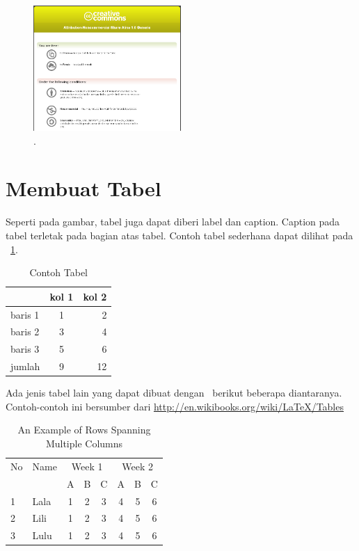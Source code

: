 \begin{figure}
	\centering
	\includegraphics[width=0.50\textwidth]
	{pics/creative_commons.png}
	\caption{\license.}
	\label{fig:testGambar}
\end{figure}


\section{Membuat Tabel}
Seperti pada gambar, tabel juga dapat diberi label dan caption. Caption pada
tabel terletak pada bagian atas tabel. Contoh tabel sederhana dapat dilihat
pada \tab~\ref{tab:tab1}.

\begin{table}
	\centering
	\caption{Contoh Tabel}
	\label{tab:tab1}
	\begin{tabular}{| l | c r |}
		\hline
		& kol 1 & kol 2 \\
		\hline
		baris 1 & 1 & 2 \\
		baris 2 & 3 & 4 \\
		baris 3 & 5 & 6 \\
		jumlah  & 9 & 12 \\
		\hline
	\end{tabular}
\end{table}

Ada jenis tabel lain yang dapat dibuat dengan \latex~berikut beberapa
diantaranya. Contoh-contoh ini bersumber dari
\url{http://en.wikibooks.org/wiki/LaTeX/Tables}

\begin{table}
	\centering
	\caption{An Example of Rows Spanning Multiple Columns}
	\label{row.spanning}
	\begin{tabular}{|l|l|*{6}{c|}} \hline %
		No & Name & \multicolumn{3}{|c|}{Week 1} & \multicolumn{3}{|c|}{Week 2}
		\\
		\cline{3-8} %
		& & A & B & C & A & B & C\\
		\hline
		1 & Lala & 1 & 2 & 3 & 4 & 5 & 6\\
		2 & Lili & 1 & 2 & 3 & 4 & 5 & 6\\
		3 & Lulu & 1 & 2 & 3 & 4 & 5 & 6\\
		\hline
	\end{tabular}
\end{table}

